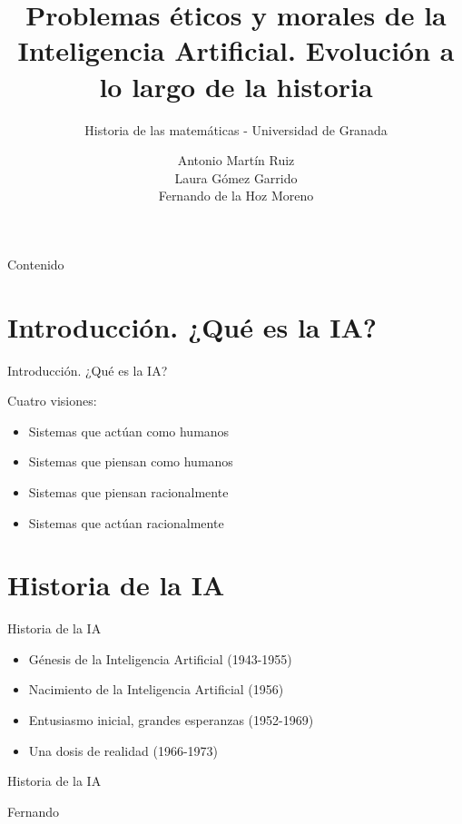 \documentclass{beamer}
\title{Problemas éticos y morales de la
Inteligencia Artificial. Evolución a lo largo de la historia}
\subtitle{Historia de las matemáticas - Universidad de Granada}
\author{Antonio Martín Ruiz \\ Laura Gómez Garrido \\ Fernando de la Hoz Moreno  }
\begin{document}
\begin{frame}
\titlepage
\end{frame}
\begin{frame}{Contenido}
  \tableofcontents
\end{frame}
\section{Introducción. ¿Qué es la IA?}

\begin{frame}{Introducción. ¿Qué es la IA?}

Cuatro visiones:

\begin{itemize}
\item Sistemas que actúan como humanos
\item Sistemas que piensan como humanos
\item Sistemas que piensan racionalmente
\item Sistemas que actúan racionalmente
\end{itemize}

\end{frame}

\section{Historia de la IA}

\begin{frame}{Historia de la IA}
\begin{itemize}
\item Génesis de la Inteligencia Artificial (1943-1955)
\item Nacimiento de la Inteligencia Artificial (1956)
\item Entusiasmo inicial, grandes esperanzas (1952-1969)
\item Una dosis de realidad (1966-1973)
\end{itemize}
\end{frame}

\begin{frame}{Historia de la IA}

Fernando

\end{frame}
\end{document}
